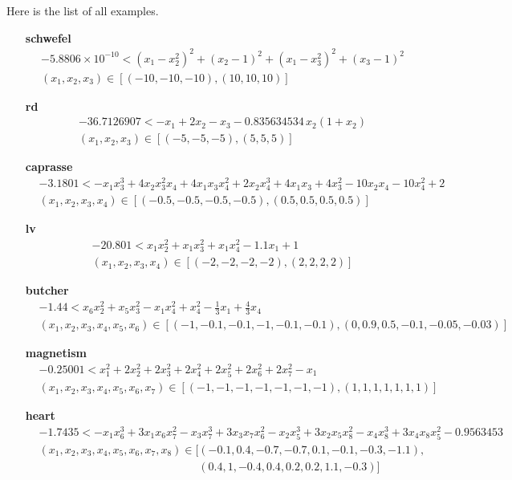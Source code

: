\documentclass[a4paper]{article}
\begin{document}
Here is the list of all examples.
\begin{itemize}
\item[\bf schwefel]
\begin{eqnarray*}
&-5.8806 \times 10^{-10} < (x_1 - x_2^2)^2 + (x_2 - 1)^2 + (x_1 - x_3^2)^2 + (x_3 - 1)^2\\
&(x_1, x_2, x_3) \in [(-10,-10,-10),(10,10,10)]
\end{eqnarray*}

\item[\bf rd] 
\begin{eqnarray*}
&-36.7126907 < -x_1 + 2 x_2 - x_3 - 0.835634534\, x_2 (1 + x_2)\\
&(x_1, x_2, x_3) \in [(-5,-5,-5),(5,5,5)]
\end{eqnarray*}

\item[\bf caprasse]
\begin{eqnarray*}
&-3.1801 < -x_1 x_3^3 + 4 x_2 x_3^2 x_4 + 4 x_1 x_3 x_4^2 + 2 x_2 x_4^3 + 4 x_1 x_3 + 4 x_3^2 - 10 x_2 x_4 - 10 x_4^2 + 2\\
&(x_1, x_2, x_3, x_4) \in [(-0.5,-0.5,-0.5,-0.5),(0.5,0.5,0.5,0.5)]
\end{eqnarray*}

\item[\bf lv]
\begin{eqnarray*}
&-20.801 < x_1 x_2^2 + x_1 x_3^2 + x_1 x_4^2 - 1.1 x_1 + 1\\
&(x_1, x_2, x_3, x_4) \in [(-2,-2,-2,-2), (2,2,2,2)]
\end{eqnarray*}

\item[\bf butcher]
\begin{eqnarray*}
&-1.44 < x_6 x_2^2 + x_5 x_3^2 - x_1 x_4^2 + x_4^2 - \frac{1}{3} x_1 + \frac{4}{3} x_4\\
&(x_1, x_2, x_3, x_4, x_5, x_6) \in [(-1,-0.1, -0.1, -1, -0.1, -0.1), (0,0.9,0.5,-0.1,-0.05,-0.03)]
\end{eqnarray*}

\item[\bf magnetism]
\begin{eqnarray*}
&-0.25001 < x_1^2 + 2 x_2^2 + 2 x_3^2 + 2 x_4^2 + 2 x_5^2 + 2 x_6^2 + 2 x_7^2 - x_1\\
&(x_1,x_2,x_3,x_4,x_5,x_6,x_7) \in [(-1,-1,-1,-1,-1,-1,-1), (1,1,1,1,1,1,1)]
\end{eqnarray*}

\item[\bf heart]
\begin{equation*}
\begin{split}
&-1.7435 < -x_1 x_6^3 + 3 x_1 x_6 x_7^2 - x_3 x_7^3 + 3 x_3 x_7 x_6^2 - x_2 x_5^3 + 3 x_2 x_5 x_8^2 - x_4 x_8^3 + 3 x_4 x_8 x_5^2 - 0.9563453\\
&(x_1,x_2,x_3,x_4,x_5,x_6,x_7,x_8) \in [(-0.1, 0.4, -0.7, -0.7, 0.1, -0.1, -0.3, -1.1),\\ &\phantom{(x_1,x_2,x_3,x_4,x_5,x_6,x_7,x_8) \in [ }(0.4, 1, -0.4, 0.4, 0.2, 0.2, 1.1, -0.3)]
\end{split}
\end{equation*}
\end{itemize}
\end{document}
